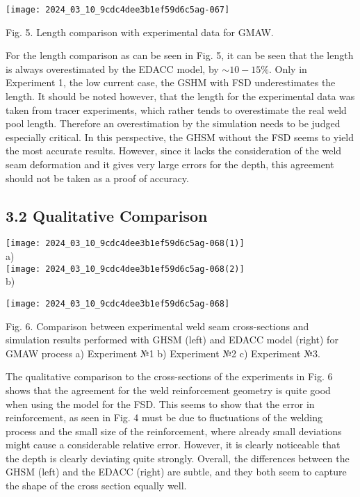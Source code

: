 \documentclass[10pt]{article}
\begin{document}
\begin{center}
\texttt{[image: 2024\_03\_10\_9cdc4dee3b1ef59d6c5ag-067]}
\end{center}

Fig. 5. Length comparison with experimental data for GMAW.

For the length comparison as can be seen in Fig. 5, it can be seen that the length is always overestimated by the EDACC model, by $\sim 10-15 \%$. Only in Experiment 1, the low current case, the GSHM with FSD underestimates the length. It should be noted however, that the length for the experimental data was taken from tracer experiments, which rather tends to overestimate the real weld pool length. Therefore an overestimation by the simulation needs to be judged especially critical. In this perspective, the GHSM without the FSD seems to yield the most accurate results. However, since it lacks the consideration of the weld seam deformation and it gives very large errors for the depth, this agreement should not be taken as a proof of accuracy.

\subsection*{3.2 Qualitative Comparison}
\texttt{[image: 2024\_03\_10\_9cdc4dee3b1ef59d6c5ag-068(1)]}\\
a)\\
\texttt{[image: 2024\_03\_10\_9cdc4dee3b1ef59d6c5ag-068(2)]}\\
b)

\begin{center}
\texttt{[image: 2024\_03\_10\_9cdc4dee3b1ef59d6c5ag-068]}
\end{center}

Fig. 6. Comparison between experimental weld seam cross-sections and simulation results performed with GHSM (left) and EDACC model (right) for GMAW process a) Experiment №1 b) Experiment №2 c) Experiment №3.

The qualitative comparison to the cross-sections of the experiments in Fig. 6 shows that the agreement for the weld reinforcement geometry is quite good when using the model for the FSD. This seems to show that the error in reinforcement, as seen in Fig. 4 must be due to fluctuations of the welding process and the small size of the reinforcement, where already small deviations might cause a considerable relative error. However, it is clearly noticeable that the depth is clearly deviating quite strongly. Overall, the differences between the GHSM (left) and the EDACC (right) are subtle, and they both seem to capture the shape of the cross section equally well.
\end{document}
